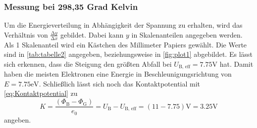 \subsubsection*{Messung bei 298,35 Grad Kelvin}
Um die Energieverteilung in Abhängigkeit der Spannung zu erhalten, wird das Verhältnis von $\frac{\increment y}{\increment x}$ gebildet.
Dabei kann $y$ in Skalenanteilen angegeben werden.
Als 1 Skalenanteil wird ein Kästchen des Millimeter Papiers gewählt.
Die Werte sind in \autoref{tab:tabelle2} angegeben, beziehungsweise in \autoref{fig:plot1} abgebildet.
Es lässt sich erkennen, dass die Steigung den größten Abfall bei $U_\text{B, eff} = 7.75 \unit\V$ hat.
Damit haben die meisten Elektronen eine Energie in Beschleunigungsrichtung von $E = 7.75 \unit\eV$.
Schließlich lässt sich noch das Kontaktpotential mit \autoref{eq:Kontaktpotential} zu
\begin{equation}
  K = \frac{\left( \Phi_\text{B} - \Phi_\text{G} \right)}{e_0} = U_\text{B} - U_\text{B, eff} = (11 - 7.75) \unit\V = 3.25 \unit\V
\end{equation}
angeben.



